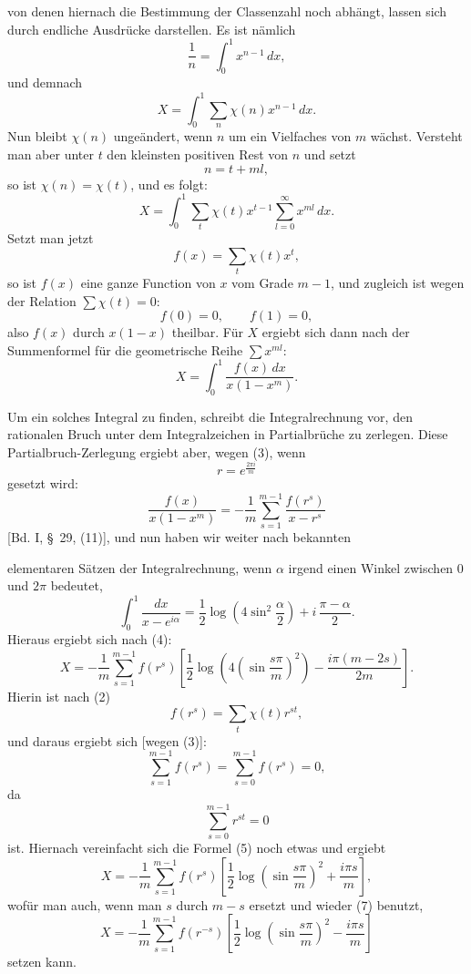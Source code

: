 \documentclass[11pt]{article}
\begin{document}
von denen hiernach die Bestimmung der Classenzahl noch abhängt, lassen sich durch endliche Ausdrücke darstellen. Es ist nämlich
\[
\frac1n=\int_0^1x^{n-1}\,dx,
\]
und demnach
\[
X=\int_0^1\sum_n\chi(n)x^{n-1}\,dx.
\]
Nun bleibt $\chi(n)$ ungeändert, wenn $n$ um ein Vielfaches von $m$ wächst. Versteht man aber unter $t$ den kleinsten positiven Rest von $n$ und setzt
\[
n=t+ml,
\]
so ist $\chi(n)=\chi(t)$, und es folgt:
\[
X=\int_0^1\sum_t\chi(t)x^{t-1}\sum_{l=0}^{\infty}x^{ml}\,dx.
\]
Setzt man jetzt
\begin{equation}
f(x)=\sum_t\chi(t)x^t,
\tag{2}
\end{equation}
so ist $f(x)$ eine ganze Function von $x$ vom Grade $m-1$, und zugleich ist wegen der Relation $\sum\chi(t)=0$:
\begin{equation}
f(0)=0,\qquad f(1)=0,
\tag{3}
\end{equation}
also $f(x)$ durch $x(1-x)$ theilbar. Für $X$ ergiebt sich dann nach der Summenformel für die geometrische Reihe $\sum x^{ml}$:
\begin{equation}
X=\int_0^1\frac{f(x)\,dx}{x(1-x^m)}.
\tag{4}
\end{equation}

Um ein solches Integral zu finden, schreibt die Integralrechnung vor, den rationalen Bruch unter dem Integralzeichen in Partialbrüche zu zerlegen. Diese Partialbruch-Zerlegung ergiebt aber, wegen (3), wenn
\[
r=e^{\frac{2\pi i}{m}}
\]
gesetzt wird:
\[
\frac{f(x)}{x(1-x^m)}
=-\frac1m\sum_{s=1}^{m-1}\frac{f(r^s)}{x-r^s}
\]
[Bd. I, \S~29, (11)], und nun haben wir weiter nach bekannten

elementaren Sätzen der Integralrechnung, wenn $\alpha$ irgend einen Winkel zwischen $0$ und $2\pi$ bedeutet,
\[
\int_0^1\frac{dx}{x-e^{i\alpha}}
=\frac12\log\left(4\sin^2\frac{\alpha}{2}\right)
+i\,\frac{\pi-\alpha}{2}.
\]
Hieraus ergiebt sich nach (4):
\begin{equation}
X=-\frac1m\sum_{s=1}^{m-1}f(r^s)
\left[\frac12\log\left(4\left(\sin\frac{s\pi}{m}\right)^2\right)-\frac{i\pi(m-2s)}{2m}\right].
\tag{5}
\end{equation}
Hierin ist nach (2)
\begin{equation}
f(r^s)=\sum_t\chi(t)r^{st},
\tag{6}
\end{equation}
und daraus ergiebt sich [wegen (3)]:
\begin{equation}
\sum_{s=1}^{m-1}f(r^s)=\sum_{s=0}^{m-1}f(r^s)=0,
\tag{7}
\end{equation}
da
\[
\sum_{s=0}^{m-1}r^{st}=0
\]
ist. Hiernach vereinfacht sich die Formel (5) noch etwas und ergiebt
\begin{equation}
X=-\frac1m\sum_{s=1}^{m-1}f(r^s)
\left[\frac12\log\left(\sin\frac{s\pi}{m}\right)^2+\frac{i\pi s}{m}\right],
\tag{8}
\end{equation}
wofür man auch, wenn man $s$ durch $m-s$ ersetzt und wieder (7) benutzt,
\begin{equation}
X=-\frac1m\sum_{s=1}^{m-1}f(r^{-s})
\left[\frac12\log\left(\sin\frac{s\pi}{m}\right)^2-\frac{i\pi s}{m}\right]
\tag{9}
\end{equation}
setzen kann.
\end{document}
